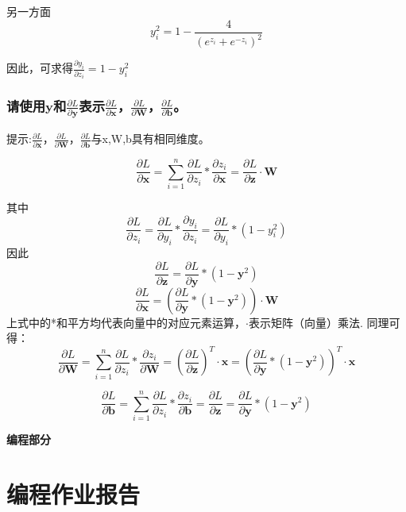 \documentclass[a4paper]{article}
\begin{document}
另一方面
$$
y_i^2 = 1-\frac{4}{\left( e^{z_i}+e^{-z_i} \right)^2}
$$

因此，可求得$\frac{\partial y_i}{\partial z_i} = 1-y_i^2$

\subsubsection{请使用$\mathbf{y}$和$\frac{\partial L}{\partial \mathbf{y}}$表示$\frac{\partial L}{\partial \mathbf{x}}$，$\frac{\partial L}{\partial \mathbf{W}}$，$\frac{\partial L}{\partial \mathbf{b}}$。
}
提示:$\frac{\partial L}{\partial \mathbf{x}}$，$\frac{\partial L}{\partial \mathbf{W}}$，$\frac{\partial L}{\partial \mathbf{b}}$与x,W,b具有相同维度。\par
$$
\frac{\partial L}{\partial \mathbf{x}} = 
\sum_{i=1}^n \frac{\partial L}{\partial z_i} * 
\frac{\partial z_i}{\partial \mathbf{x}} = 
\frac{\partial L}{\partial \mathbf{z}}\cdot \mathbf{W}
$$

其中
$$
\frac{\partial L}{\partial z_i} = \frac{\partial L}{\partial y_i}*
\frac{\partial y_i}{\partial z_i} = \frac{\partial L}{\partial y_i} * (1-y_i^2)
$$
因此
$$
\frac{\partial L}{\partial \mathbf{z}} = 
\frac{\partial L}{\partial \mathbf{y}}* (1-\mathbf{y}^2)
$$
$$
\frac{\partial L}{\partial \mathbf{x}} = \left(
\frac{\partial L}{\partial \mathbf{y}}* (1-\mathbf{y}^2)
\right)\cdot \mathbf{W}
$$
上式中的*和平方均代表向量中的对应元素运算，$\cdot$表示矩阵（向量）乘法.
同理可得：
$$
\frac{\partial L}{\partial \mathbf{W}} = 
\sum_{i=1}^n \frac{\partial L}{\partial z_i} * 
\frac{\partial z_i}{\partial \mathbf{W}} = \left(
\frac{\partial L}{\partial \mathbf{z}}  \right)^T \cdot \mathbf{x}=
\left( \frac{\partial L}{\partial \mathbf{y}}* (1-\mathbf{y}^2) \right)^T
\cdot \mathbf{x}
$$

$$
\frac{\partial L}{\partial \mathbf{b}} = 
\sum_{i=1}^n \frac{\partial L}{\partial z_i} * 
\frac{\partial z_i}{\partial \mathbf{b}} = 
\frac{\partial L}{\partial \mathbf{z}} =\frac{\partial L}{\partial \mathbf{y}}* (1-\mathbf{y}^2)
$$

\vspace{6mm}
\centerline{\textbf{\Large{编程部分}}}
\vspace{3mm}
\section{编程作业报告}
\end{document}
